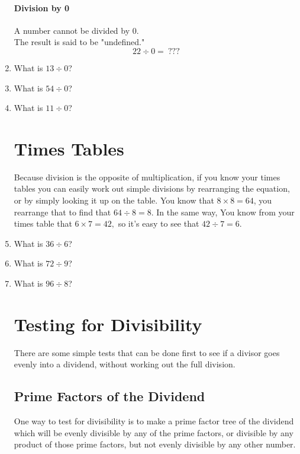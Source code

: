 \documentclass[12pt]{article}
\begin{document}
\begin{enumerate}
\paragraph{Division by 0}
A number cannot be divided by 0.\\ The result is said to be "undefined."\\

$$22 \div 0 = \ ???$$

\item What is $13 \div 0$?
\item What is $54 \div 0$?
\item What is $11 \div 0$?

\section*{Times Tables}
Because division is the opposite of multiplication, if you know your times tables you can easily work out simple divisions by rearranging the equation, or by simply looking it up on the table. You know that $8 \times 8 = 64$, you rearrange that to find that $64 \div 8 = 8.$ In the same way, You know from your times table that $6 \times 7 = 42,$ so it's easy to see that $42 \div 7 = 6.$\\

\item What is $36 \div 6$?
\item What is $72 \div 9$?
\item What is $96 \div 8$?

\section*{Testing for Divisibility}

There are some simple tests that can be done first to see if a divisor goes evenly into a dividend, without working out the full division.\\

\subsection*{Prime Factors of the Dividend}

One way to test for divisibility is to make a prime factor tree of the dividend which will be evenly divisible by any of the prime factors, or divisible by any product of those prime factors, but not evenly divisible by any other number.\\


\end{enumerate}
\end{document}
